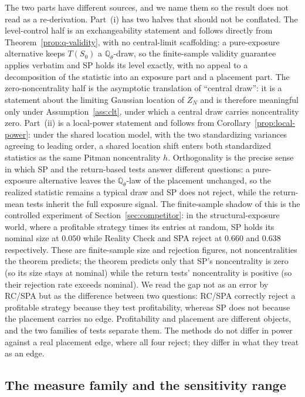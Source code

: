 \documentclass[risks,article,submit,pdftex,oneauthor]{Definitions/mdpi}
\begin{document}
The two parts have different sources, and we name them so the result does not read
as a re-derivation. Part~(i) has two halves that should not be conflated. The
level-control half is an exchangeability statement and follows directly from
Theorem~\ref{prop:q-validity}, with no central-limit scaffolding: a pure-exposure
alternative keeps $T(S_0)$ a $\mathbb{Q}_\theta$-draw, so the finite-sample
validity guarantee applies verbatim and SP holds its level exactly, with no appeal
to a decomposition of the statistic into an exposure part and a placement part. The
zero-noncentrality half is the asymptotic translation of ``central draw'': it is a
statement about the limiting Gaussian location of $Z_N$ and is therefore meaningful
only under Assumption~\ref{ass:clt}, under which a central draw carries noncentrality
zero. Part~(ii) is a local-power statement and follows from
Corollary~\ref{prop:local-power}: under the shared location model, with the two
standardizing variances agreeing to leading order, a shared location shift enters
both standardized statistics as the same Pitman noncentrality $h$. Orthogonality
is the precise sense in which SP and the return-based tests answer different
questions: a pure-exposure alternative leaves the $\mathbb{Q}_\theta$-law of the
placement unchanged, so the realized statistic remains a typical draw and SP does
not reject, while the return-mean tests inherit the full exposure signal. The
finite-sample shadow of this is the controlled experiment of
Section~\ref{sec:competitor}: in the structural-exposure world, where a profitable
strategy times its entries at random, SP holds its nominal size at $0.050$ while
Reality Check and SPA reject at $0.660$ and $0.638$ respectively. These are
finite-sample size and rejection figures, not noncentralities the theorem
predicts; the theorem predicts only that SP's noncentrality is zero (so its size
stays at nominal) while the return tests' noncentrality is positive (so their
rejection rate exceeds nominal). We read the gap not
as an error by RC/SPA but as the difference between two questions: RC/SPA
correctly reject a profitable strategy because they test profitability, whereas SP
does not because the placement carries no edge. Profitability and placement are
different objects, and the two families of tests separate them. The methods do not
differ in power against a real placement edge, where all four reject; they differ
in what they treat as an edge.

\subsection{The measure family and the sensitivity range}
\label{sec:measure-family}
\end{document}
